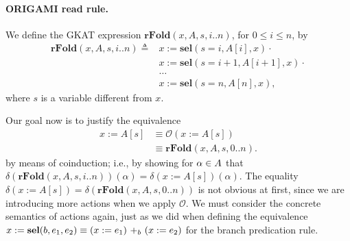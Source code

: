 \paragraph{ORIGAMI read rule.} 
We define the GKAT expression $\textbf{rFold}(x,A,s,i..n)$, for $0\leq i\leq n$, by
\begin{align*}
    \textbf{rFold}(x,A,s,i..n)\triangleq&
    x:=\textbf{sel}(s=i,A[i],x)\cdot\\
    &x:=\textbf{sel}(s=i+1,A[i+1],x)\cdot\\
    &\ldots\\
    &x:=\textbf{sel}(s=n,A[n],x),
\end{align*}
where $s$ is a variable different from $x$.

Our goal now is to justify the equivalence 
\begin{align*}
    x:=A[s]&\equiv \mathscr{O}(x:=A[s])\\
    &\equiv \textbf{rFold}(x,A,s,0..n).
\end{align*}
by means of coinduction; i.e., by showing for $\alpha \in \Atom$ that $\delta(\textbf{rFold}(x,A,s,i..n))(\alpha)=\delta(x:=A[s])(\alpha)$. 
The equality $\delta(x:=A[s])=\delta(\textbf{rFold}(x,A,s,0..n))$ is not obvious at first, since we are introducing more actions when we apply $\mathscr{O}$. We must consider the concrete semantics of actions again, just as we did when defining the equivalence $x:=\textbf{sel}(b,e_1,e_2)\equiv \branch{b}{(x:=e_1)}{(x:=e_2)}$ for the branch predication rule. 

